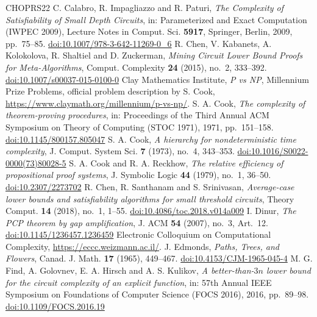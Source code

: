 \documentclass[11pt,reqno]{amsart}
\numberwithin{equation}{section}
\theoremstyle{plain}
\theoremstyle{definition}
\theoremstyle{remark}
\begin{document}
\begin{thebibliography}{CHOPRS22}
 C. Calabro, R. Impagliazzo and R. Paturi, \emph{The Complexity of Satisfiability of Small Depth Circuits}, in: Parameterized and Exact Computation (IWPEC 2009), Lecture Notes in Comput. Sci. \textbf{5917}, Springer, Berlin, 2009, pp.~75--85. \href{https://doi.org/10.1007/978-3-642-11269-0_6}{doi:10.1007/978-3-642-11269-0\_6}
 R. Chen, V. Kabanets, A. Kolokolova, R. Shaltiel and D. Zuckerman, \emph{Mining Circuit Lower Bound Proofs for Meta-Algorithms}, Comput. Complexity \textbf{24} (2015), no.~2, 333--392. \href{https://doi.org/10.1007/s00037-015-0100-0}{doi:10.1007/s00037-015-0100-0}
 Clay Mathematics Institute, \emph{P vs NP}, Millennium Prize Problems, official problem description by S. Cook, \url{https://www.claymath.org/millennium/p-vs-np/}.
 S. A. Cook, \emph{The complexity of theorem-proving procedures}, in: Proceedings of the Third Annual ACM Symposium on Theory of Computing (STOC 1971), 1971, pp.~151--158. \href{https://doi.org/10.1145/800157.805047}{doi:10.1145/800157.805047}
 S. A. Cook, \emph{A hierarchy for nondeterministic time complexity}, J. Comput. System Sci. \textbf{7} (1973), no.~4, 343--353. \href{https://doi.org/10.1016/S0022-0000(73)80028-5}{doi:10.1016/S0022-0000(73)80028-5}
 S. A. Cook and R. A. Reckhow, \emph{The relative efficiency of propositional proof systems}, J. Symbolic Logic \textbf{44} (1979), no.~1, 36--50. \href{https://doi.org/10.2307/2273702}{doi:10.2307/2273702}
 R. Chen, R. Santhanam and S. Srinivasan, \emph{Average-case lower bounds and satisfiability algorithms for small threshold circuits}, Theory Comput. \textbf{14} (2018), no.~1, 1--55. \href{https://doi.org/10.4086/toc.2018.v014a009}{doi:10.4086/toc.2018.v014a009}
 I. Dinur, \emph{The PCP theorem by gap amplification}, J. ACM \textbf{54} (2007), no.~3, Art.~12. \href{https://doi.org/10.1145/1236457.1236459}{doi:10.1145/1236457.1236459}
 Electronic Colloquium on Computational Complexity, \url{https://eccc.weizmann.ac.il/}.
 J. Edmonds, \emph{Paths, Trees, and Flowers}, Canad. J. Math. \textbf{17} (1965), 449--467. \href{https://doi.org/10.4153/CJM-1965-045-4}{doi:10.4153/CJM-1965-045-4}
 M. G. Find, A. Golovnev, E. A. Hirsch and A. S. Kulikov, \emph{A better-than-$3n$ lower bound for the circuit complexity of an explicit function}, in: 57th Annual IEEE Symposium on Foundations of Computer Science (FOCS 2016), 2016, pp.~89--98. \href{https://doi.org/10.1109/FOCS.2016.19}{doi:10.1109/FOCS.2016.19}

\end{thebibliography}
\end{document}
